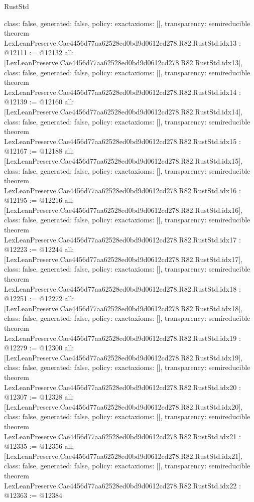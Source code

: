 \begin{lexlean}{RustStd}
\begin{coremodule}
{  class: false,
  generated: false,
  policy: exact{axioms: []},
  transparency: semireducible
}
theorem LexLeanPreserve.Cae4456d77aa62528ed0bd9d0612cd278.R82.RustStd.idx13 : @12111 := @12132 {
  all: [LexLeanPreserve.Cae4456d77aa62528ed0bd9d0612cd278.R82.RustStd.idx13],
  class: false,
  generated: false,
  policy: exact{axioms: []},
  transparency: semireducible
}
theorem LexLeanPreserve.Cae4456d77aa62528ed0bd9d0612cd278.R82.RustStd.idx14 : @12139 := @12160 {
  all: [LexLeanPreserve.Cae4456d77aa62528ed0bd9d0612cd278.R82.RustStd.idx14],
  class: false,
  generated: false,
  policy: exact{axioms: []},
  transparency: semireducible
}
theorem LexLeanPreserve.Cae4456d77aa62528ed0bd9d0612cd278.R82.RustStd.idx15 : @12167 := @12188 {
  all: [LexLeanPreserve.Cae4456d77aa62528ed0bd9d0612cd278.R82.RustStd.idx15],
  class: false,
  generated: false,
  policy: exact{axioms: []},
  transparency: semireducible
}
theorem LexLeanPreserve.Cae4456d77aa62528ed0bd9d0612cd278.R82.RustStd.idx16 : @12195 := @12216 {
  all: [LexLeanPreserve.Cae4456d77aa62528ed0bd9d0612cd278.R82.RustStd.idx16],
  class: false,
  generated: false,
  policy: exact{axioms: []},
  transparency: semireducible
}
theorem LexLeanPreserve.Cae4456d77aa62528ed0bd9d0612cd278.R82.RustStd.idx17 : @12223 := @12244 {
  all: [LexLeanPreserve.Cae4456d77aa62528ed0bd9d0612cd278.R82.RustStd.idx17],
  class: false,
  generated: false,
  policy: exact{axioms: []},
  transparency: semireducible
}
theorem LexLeanPreserve.Cae4456d77aa62528ed0bd9d0612cd278.R82.RustStd.idx18 : @12251 := @12272 {
  all: [LexLeanPreserve.Cae4456d77aa62528ed0bd9d0612cd278.R82.RustStd.idx18],
  class: false,
  generated: false,
  policy: exact{axioms: []},
  transparency: semireducible
}
theorem LexLeanPreserve.Cae4456d77aa62528ed0bd9d0612cd278.R82.RustStd.idx19 : @12279 := @12300 {
  all: [LexLeanPreserve.Cae4456d77aa62528ed0bd9d0612cd278.R82.RustStd.idx19],
  class: false,
  generated: false,
  policy: exact{axioms: []},
  transparency: semireducible
}
theorem LexLeanPreserve.Cae4456d77aa62528ed0bd9d0612cd278.R82.RustStd.idx20 : @12307 := @12328 {
  all: [LexLeanPreserve.Cae4456d77aa62528ed0bd9d0612cd278.R82.RustStd.idx20],
  class: false,
  generated: false,
  policy: exact{axioms: []},
  transparency: semireducible
}
theorem LexLeanPreserve.Cae4456d77aa62528ed0bd9d0612cd278.R82.RustStd.idx21 : @12335 := @12356 {
  all: [LexLeanPreserve.Cae4456d77aa62528ed0bd9d0612cd278.R82.RustStd.idx21],
  class: false,
  generated: false,
  policy: exact{axioms: []},
  transparency: semireducible
}
theorem LexLeanPreserve.Cae4456d77aa62528ed0bd9d0612cd278.R82.RustStd.idx22 : @12363 := @12384 {
}
\end{coremodule}
\end{lexlean}

